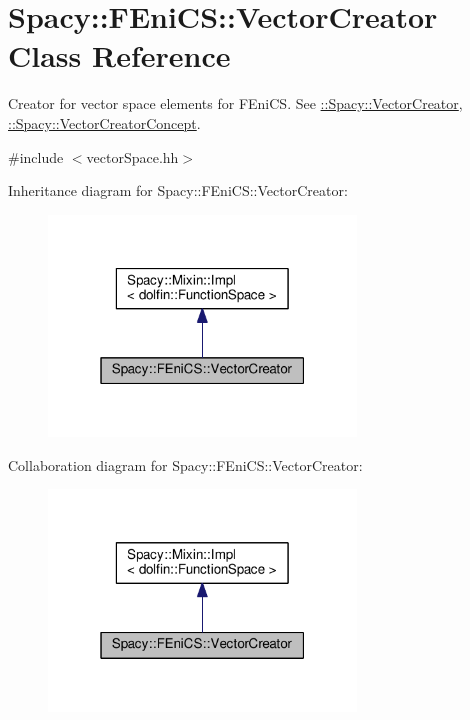 \hypertarget{classSpacy_1_1FEniCS_1_1VectorCreator}{}\section{Spacy\+:\+:F\+Eni\+C\+S\+:\+:Vector\+Creator Class Reference}
\label{classSpacy_1_1FEniCS_1_1VectorCreator}


Creator for vector space elements for F\+Eni\+C\+S. See \hyperlink{group__SpacyGroup_ga1f5316487c031a478247206764bb2efb_VectorCreatorAnchor}{\+:\+:Spacy\+:\+:Vector\+Creator}, \hyperlink{group__ConceptGroup_ga3064301642b7c66b1b08f88a12a04645_VectorCreatorConceptAnchor}{\+:\+:Spacy\+:\+:Vector\+Creator\+Concept}.  




{\ttfamily \#include $<$vector\+Space.\+hh$>$}



Inheritance diagram for Spacy\+:\+:F\+Eni\+C\+S\+:\+:Vector\+Creator\+:\nopagebreak
\begin{figure}[H]
\begin{center}
\leavevmode
\includegraphics[width=232pt]{classSpacy_1_1FEniCS_1_1VectorCreator__inherit__graph}
\end{center}
\end{figure}


Collaboration diagram for Spacy\+:\+:F\+Eni\+C\+S\+:\+:Vector\+Creator\+:\nopagebreak
\begin{figure}[H]
\begin{center}
\leavevmode
\includegraphics[width=232pt]{classSpacy_1_1FEniCS_1_1VectorCreator__coll__graph}
\end{center}
\end{figure}
